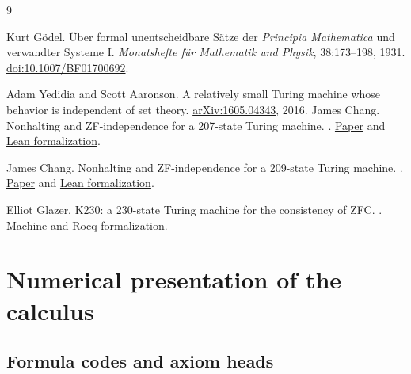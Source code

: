 \documentclass[11pt,letterpaper]{article}
\begin{document}
\begin{thebibliography}{9}
\raggedright
{}
Kurt G\"odel.
\newblock \"Uber formal unentscheidbare S\"atze der \emph{Principia
  Mathematica} und verwandter Systeme I.
\newblock \emph{Monatshefte f\"ur Mathematik und Physik}, 38:173--198,
  1931. \href{https://doi.org/10.1007/BF01700692}{doi:10.1007/BF01700692}.

Adam Yedidia and Scott Aaronson.
\newblock A relatively small Turing machine whose behavior is independent
  of set theory.
\newblock \href{https://arxiv.org/abs/1605.04343}{arXiv:1605.04343}, 2016.
James Chang.
\newblock Nonhalting and ZF-independence for a 207-state Turing machine.
.
\href{https://github.com/jamesyc/BusyBeaver/blob/9437ef874e1c76a0ec45330554e895157d56c604/ZF207/paper/zf207.pdf}{Paper}
and
\href{https://github.com/jamesyc/BusyBeaver/tree/9437ef874e1c76a0ec45330554e895157d56c604/ZF207}{Lean formalization}.

James Chang.
\newblock Nonhalting and ZF-independence for a 209-state Turing machine.
.
\href{https://github.com/jamesyc/BusyBeaver/blob/286324f9ad106bbeab32b70404e7a82be2cd660d/ZF209/paper/zf209.pdf}{Paper}
and
\href{https://github.com/jamesyc/BusyBeaver/tree/286324f9ad106bbeab32b70404e7a82be2cd660d/ZF209}{Lean formalization}.

Elliot Glazer.
\newblock K230: a 230-state Turing machine for the consistency of ZFC.
.
\href{https://github.com/elliotglazer/k230-rocq/tree/3142e4dd980f0be12f4abb636c4ae2528afc17eb}{Machine and Rocq formalization}.

\end{thebibliography}

\appendix
\section{Numerical presentation of the calculus}\label{app:calculus}

\subsection{Formula codes and axiom heads}
\end{document}
